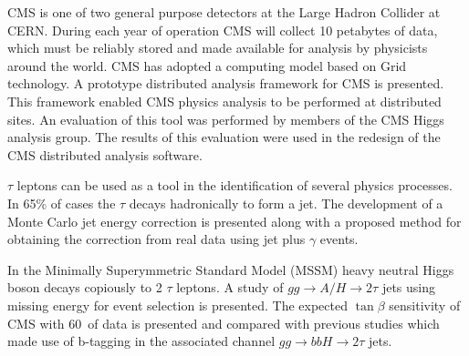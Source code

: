%


CMS is one of two general purpose detectors at the Large Hadron Collider at CERN. During each year of operation CMS will collect 10 petabytes of data, which must be reliably stored and made available for analysis by physicists around the world. CMS has adopted a computing model based on Grid technology. A prototype distributed analysis framework for CMS is presented. This framework enabled CMS physics analysis to be performed at distributed sites. An evaluation of this tool was performed by  members of the CMS Higgs analysis group. The results of this evaluation were used in the redesign of the CMS distributed analysis software.

$\tau$ leptons can be used as a tool in the identification of several physics processes. In 65\% of cases the $\tau$ decays hadronically to form a jet. The development of a Monte Carlo jet energy correction is presented along with a proposed method for obtaining the correction from real data using jet plus $\gamma$ events.

In the Minimally Superymmetric Standard Model (MSSM) heavy neutral Higgs boson decays copiously to 2 $\tau$ leptons. A study of $gg \rightarrow A/H \rightarrow 2 \tau$ jets using missing energy for event selection is presented. The expected $\tan\beta$ sensitivity of CMS with 60~\fb of data is presented and compared with previous studies which made use of b-tagging in the associated channel $gg \rightarrow bbH \rightarrow 2 \tau$ jets.
